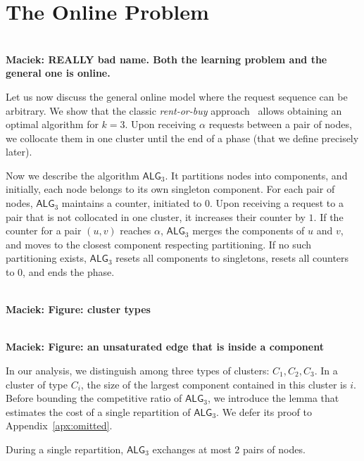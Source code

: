 \documentclass[manuscript,screen=true, review, anonymous]{acmart}
\newcommand{\OPT}{\textsf{OPT}\xspace}
\newcommand{\OBRP}{BRP}
\newcommand{\TAlg}{{\ensuremath{\textsf{ALG}_{3}}}\xspace} %
\newcommand\maciek[1]{\color{brown}\textbf{\\ Maciek: #1}\color{black}}
\begin{document}
 
\section{The Online Problem}
\label{sec:k3}

\maciek{REALLY bad name. Both the learning problem and the general one is online.}

Let us now discuss the general online
model where the request sequence
can be arbitrary. We show that the classic \emph{rent-or-buy} approach~\cite{karlin-ski-rental} allows obtaining an optimal algorithm for $k=3$.
Upon receiving $\alpha$ requests between a pair of nodes, we collocate them in one cluster until the end of a phase (that we define precisely later).

Now we describe the algorithm \TAlg.
It partitions nodes into components, and
initially, each node belongs to its own singleton component.
For each pair of nodes, \TAlg maintains a counter, initiated to $0$. 
Upon receiving a request to a pair that is not collocated in one cluster, it increases their counter by $1$.
If the counter for a pair $(u,v)$ reaches $\alpha$, \TAlg merges the components of $u$ and $v$, and moves to the closest component respecting partitioning.
If no such partitioning exists, \TAlg resets all components to singletons, resets all counters to $0$, and ends the phase.



\maciek{Figure: cluster types}

\maciek{Figure: an unsaturated edge that is inside a component}


In our analysis, we distinguish among three types of clusters: $C_1, C_2, C_3$. In a cluster of type $C_i$, the size of the largest component contained in this cluster is $i$.
Before bounding the competitive ratio of \TAlg, we introduce the lemma that estimates the cost of a single repartition of \TAlg. We defer its proof to Appendix~\ref{apx:omitted}.

\begin{lemma}
  \label{lem:1req}
  During a single repartition, \TAlg exchanges at most $2$ pairs of nodes.
\end{lemma}
\end{document}
